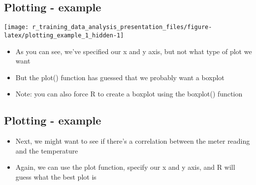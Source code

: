 \documentclass[]{article}
\newenvironment{Shaded}{\begin{snugshade}}{\end{snugshade}}
\newcommand{\KeywordTok}[1]{\textcolor[rgb]{0.13,0.29,0.53}{\textbf{#1}}}
\newcommand{\DataTypeTok}[1]{\textcolor[rgb]{0.13,0.29,0.53}{#1}}
\newcommand{\OperatorTok}[1]{\textcolor[rgb]{0.81,0.36,0.00}{\textbf{#1}}}
\newcommand{\NormalTok}[1]{#1}
\providecommand{\tightlist}{%
  \setlength{\itemsep}{0pt}\setlength{\parskip}{0pt}}
\begin{document}
\begin{Shaded}
\end{Shaded}

\subsection{Plotting - example}\label{plotting---example-1}

\begin{center}\texttt{[image: r\_training\_data\_analysis\_presentation\_files/figure-latex/plotting\_example\_1\_hidden-1]} \end{center}

\begin{itemize}
\tightlist
\item
  As you can see, we've specified our x and y axis, but not what type of
  plot we want
\item
  But the plot() function has guessed that we probably want a boxplot
\item
  Note: you can also force R to create a boxplot using the boxplot()
  function
\end{itemize}

\subsection{Plotting - example}\label{plotting---example-2}

\begin{itemize}
\tightlist
\item
  Next, we might want to see if there's a correlation between the meter
  reading and the temperature
\item
  Again, we can use the plot function, specify our x and y axis, and R
  will guess what the best plot is
\end{itemize}

\begin{Shaded}
\end{Shaded}
\end{document}
